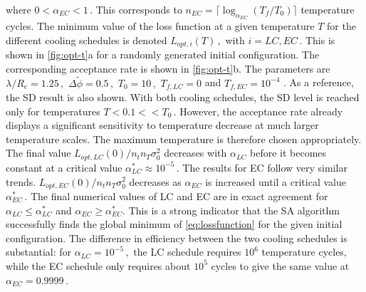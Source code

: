 \documentclass[bachelor,       %
               oneside,        %
               BCOR10mm,       %
               ngerman, english %
               ]{GAUBM}
\begin{document}
where $0<\alpha_{EC}<1\,.$ This corresponds to $n_{EC}=\lceil\log_{\alpha_{EC}}(T_f/T_0)\rceil$ temperature cycles. The minimum value of the loss function at a given temperature $T$ for the different cooling schedules is denoted $L_{opt,i}(T)\,,$ with $i=LC,EC\,.$ This is shown in \autoref{fig:opt-t}a for a randomly generated initial configuration. The corresponding acceptance rate is shown in \autoref{fig:opt-t}b. The parameters are $\lambda/R_e=1.25\,,$ $\Delta\tilde\phi=0.5\,,$ $T_0=10\,,$ $T_{f,LC}=0$ and $T_{f,EC}=10^{-4}$ . As a reference, the \ac{SD} result is also shown. With both cooling schedules, the \ac{SD} level is reached only for temperatures $T<0.1<<T_0\,.$ However, the acceptance rate already displays a significant sensitivity to temperature decrease at much larger temperature scales. The maximum temperature is therefore chosen appropriately. The final value $L_{opt,LC}(0)/n_tn_T\sigma_0^2$ decreases with $\alpha_{LC}$ before it becomes constant at a critical value $\alpha^*_{LC}\approx 10^{-5}\,.$ The results for \ac{EC} follow very similar trends. $L_{opt,EC}(0)/n_tn_T\sigma_0^2$ decreases as $\alpha_{EC}$ is increased until a critical value $\alpha^*_{EC}\,.$ The final numerical values of \ac{LC} and \ac{EC} are in exact agreement for $\alpha_{LC}\leq \alpha^*_{LC}$ and $\alpha_{EC}\geq \alpha^*_{EC}$. This is a strong indicator that the \ac{SA} algorithm successfully finds the global minimum of \autoref{eq:lossfunction} for the given initial configuration. The difference in efficiency between the two cooling schedules is substantial: for $\alpha_{LC}=10^{-5}\,,$ the \ac{LC} schedule requires $10^6$ temperature cycles, while the \ac{EC} schedule only requires about $10^{5}$ cycles to give the same value at $\alpha_{EC}=0.9999\,.$ 
\end{document}
